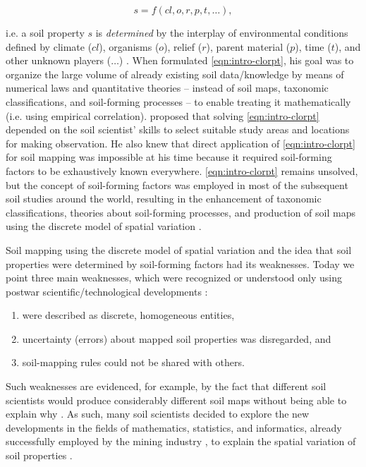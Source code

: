 \begin{equation}\label{eqn:intro-clorpt}
s = f(cl, o, r, p, t, \ldots),
\end{equation}

\noindent
i.e. a soil property $s$ is \emph{determined} by the interplay of environmental conditions defined
by climate ($cl$), organisms ($o$), relief ($r$), parent material ($p$), time ($t$), and other unknown 
players ($\ldots$) \cite{Jenny1941}. When  formulated \autoref{eqn:intro-clorpt},
his goal was to organize the large volume of already existing soil data/knowledge by means of 
numerical laws and quantitative theories -- instead of soil maps, taxonomic classifications, and 
soil-forming processes -- to enable treating it mathematically (i.e. using empirical correlation). 
 proposed that solving \autoref{eqn:intro-clorpt} depended on the soil scientist' 
skills to select suitable study areas and locations for making observation. He also knew that direct 
application of \autoref{eqn:intro-clorpt} for soil mapping was impossible at his time because it 
required soil-forming factors to be exhaustively known everywhere. \autoref{eqn:intro-clorpt} 
remains unsolved, but the concept of soil-forming factors was employed in most of the subsequent soil 
studies around the world, resulting in the enhancement of taxonomic classifications, theories about 
soil-forming processes, and production of soil maps using the discrete model of spatial variation 
\cite{Schelling1970,Hudson1992,BockheimEtAl2000,Legros2006,KrasilnikovEtAl2009b,HarteminkEtAl2013}.

Soil mapping using the discrete model of spatial variation and the idea that soil properties were 
determined by soil-forming factors had its weaknesses. Today we point three main weaknesses, which 
were recognized or understood only using postwar scientific/technological developments 
\cite{HeuvelinkEtAl2001,McBratneyEtAl2003,ScullEtAl2003}:

\begin{enumerate}
\item {} were described as discrete, homogeneous entities,
\item uncertainty (errors) about mapped soil properties was disregarded, and
\item soil-mapping rules could not be shared with others.
\end{enumerate}

\noindent
Such weaknesses are evidenced, for example, by the fact that different soil scientists would produce 
considerably different soil maps without being able to explain why \cite{Legros2006,BazagliaFilhoEtAl2013}.
As such, many soil scientists decided to explore the new developments in the
fields of mathematics, statistics, and informatics, already successfully employed by the mining 
industry \cite{Matheron1969}, to explain the spatial variation of soil properties \cite{WebsterEtAl1990}.

